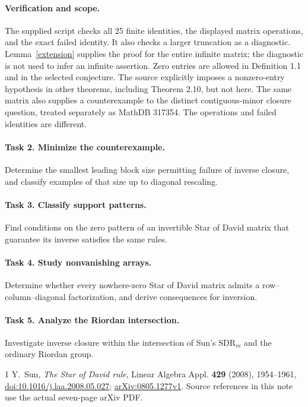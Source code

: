 \documentclass[10pt]{article}
\newcommand{\SDR}{\mathrm{SDR}}
\begin{document}
\paragraph{Verification and scope.}
The supplied script checks all 25 finite identities, the displayed
matrix operations, and the exact failed identity. It also checks a
larger truncation as a diagnostic. Lemma~\ref{extension} supplies the
proof for the entire infinite matrix; the diagnostic is not used to
infer an infinite assertion. Zero entries are allowed in Definition 1.1
and in the selected conjecture. The source explicitly imposes a
nonzero-entry hypothesis in other theorems, including Theorem 2.10,
but not here.
The same matrix also supplies a counterexample to the distinct contiguous-minor closure question, treated separately as MathDB 317354. The operations and failed identities are different.

\paragraph{Task 2. Minimize the counterexample.}
Determine the smallest leading block size permitting failure of inverse
closure, and classify examples of that size up to diagonal rescaling.

\paragraph{Task 3. Classify support patterns.}
Find conditions on the zero pattern of an invertible Star of David
matrix that guarantee its inverse satisfies the same rules.

\paragraph{Task 4. Study nonvanishing arrays.}
Determine whether every nowhere-zero Star of David matrix admits a
row--column--diagonal factorization, and derive consequences for inversion.

\paragraph{Task 5. Analyze the Riordan intersection.}
Investigate inverse closure within the intersection of Sun's
\(\SDR_m\) and the ordinary Riordan group.

\begin{thebibliography}{1}
 Y.~Sun, \emph{The Star of David rule}, Linear Algebra
Appl. \textbf{429} (2008), 1954--1961,
\href{https://doi.org/10.1016/j.laa.2008.05.027}{doi:10.1016/j.laa.2008.05.027};
\href{https://arxiv.org/abs/0805.1277}{arXiv:0805.1277v1}.
Source references in this note use the actual seven-page arXiv PDF.
\end{thebibliography}
\end{document}
